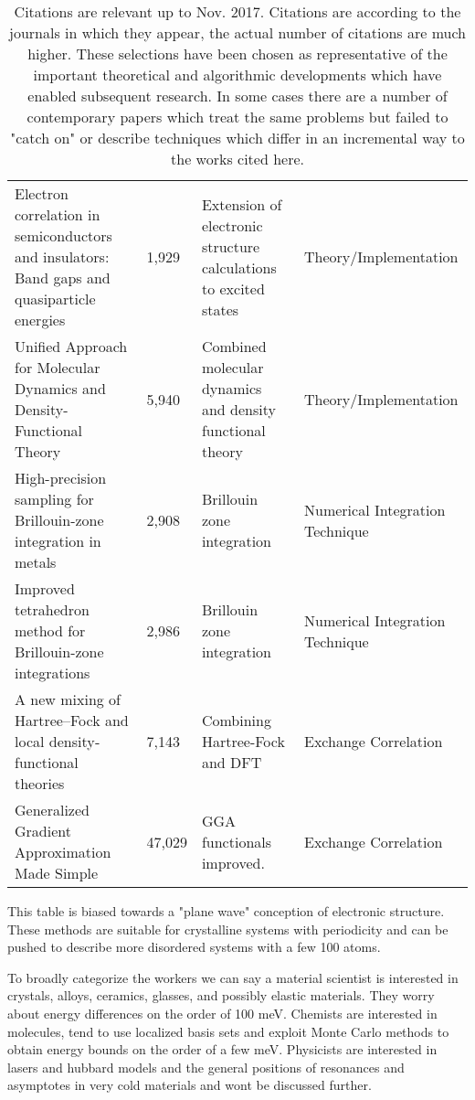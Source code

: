 \begin{table}
\begin{tabular}{|l|l|l|l|}
Electron correlation in semiconductors and insulators: Band gaps and quasiparticle energies \cite{hybertsen86} & 1,929 & Extension of electronic structure calculations to excited states& Theory/Implementation \\
Unified Approach for Molecular Dynamics and Density-Functional Theory \cite{car85} & 5,940 & Combined molecular dynamics and density functional theory & Theory/Implementation \\
High-precision sampling for Brillouin-zone integration in metals \cite{methfessel89} & 2,908 & Brillouin zone integration & Numerical Integration Technique \\
Improved tetrahedron method for Brillouin-zone integrations \cite{blochl94} &  2,986 & Brillouin zone integration & Numerical Integration Technique\\
A new mixing of Hartree–Fock and local density‐functional theories \cite{becke93} & 7,143 & Combining Hartree-Fock and DFT & Exchange Correlation \\
Generalized Gradient Approximation Made Simple \cite{perdew96} & 47,029 & GGA functionals improved.& Exchange Correlation \\
\end{tabular}
\caption{Citations are relevant up to Nov. 2017. Citations are according to the journals in which they appear, the actual number of
citations are much higher. These selections have been chosen as representative of the important theoretical and algorithmic developments
which have enabled subsequent research. In some cases there are a number of contemporary papers which
treat the same problems but failed to "catch on" or describe techniques which differ in an incremental way to the works cited here. 
\label{tab:foundation}}
\end{table}

This table is biased towards a "plane wave" conception of electronic structure. These methods are suitable for crystalline systems
with periodicity and can be pushed to describe more disordered systems with a few 100 atoms. 

To broadly categorize the workers we can say a material scientist 
is interested in crystals, alloys, ceramics, glasses, and possibly elastic materials. They
worry about energy differences on the order of 100 meV. Chemists are interested in molecules, tend to use localized basis sets and 
exploit Monte Carlo methods to obtain energy bounds on the order of a few meV. Physicists are interested in lasers and hubbard models and the 
general positions of resonances and asymptotes in very cold materials and wont be discussed further.

